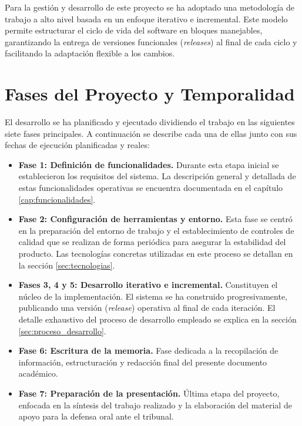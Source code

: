 Para la gestión y desarrollo de este proyecto se ha adoptado una metodología de trabajo a alto nivel basada en un enfoque iterativo e incremental. Este modelo permite estructurar el ciclo de vida del software en bloques manejables, garantizando la entrega de versiones funcionales (\textit{releases}) al final de cada ciclo y facilitando la adaptación flexible a los cambios.

\section{Fases del Proyecto y Temporalidad}

El desarrollo se ha planificado y ejecutado dividiendo el trabajo en las siguientes siete fases principales. A continuación se describe cada una de ellas junto con sus fechas de ejecución planificadas y reales:

\begin{itemize}
    \item \textbf{Fase 1: Definición de funcionalidades.} Durante esta etapa inicial se establecieron los requisitos del sistema. La descripción general y detallada de estas funcionalidades operativas se encuentra documentada en el capítulo \ref{cap:funcionalidades}.
    
    \item \textbf{Fase 2: Configuración de herramientas y entorno.} Esta fase se centró en la preparación del entorno de trabajo y el establecimiento de controles de calidad que se realizan de forma periódica para asegurar la estabilidad del producto. Las tecnologías concretas utilizadas en este proceso se detallan en la sección \ref{sec:tecnologias}.
    
    \item \textbf{Fases 3, 4 y 5: Desarrollo iterativo e incremental.} Constituyen el núcleo de la implementación. El sistema se ha construido progresivamente, publicando una versión (\textit{release}) operativa al final de cada iteración. El detalle exhaustivo del proceso de desarrollo empleado se explica en la sección \ref{sec:proceso_desarrollo}.
    
    \item \textbf{Fase 6: Escritura de la memoria.} Fase dedicada a la recopilación de información, estructuración y redacción final del presente documento académico.
    
    \item \textbf{Fase 7: Preparación de la presentación.} Última etapa del proyecto, enfocada en la síntesis del trabajo realizado y la elaboración del material de apoyo para la defensa oral ante el tribunal.
\end{itemize}

